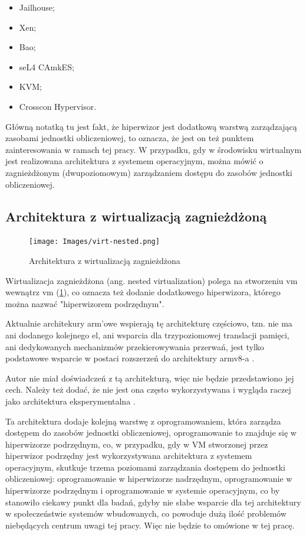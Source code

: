 \documentclass[../../main]{subfiles}
\begin{document}
\begin{itemize}
    \item Jailhouse;
    \item Xen;
    \item Bao;
    \item seL4 CAmkES;
    \item KVM;
    \item Crosscon Hypervisor.
\end{itemize}

Główną notatką tu jest fakt, że hiperwizor jest dodatkową warstwą zarządzającą zasobami jednostki
obliczeniowej, to oznacza, że jest on też punktem zainteresowania w ramach tej pracy. W przypadku, gdy
w środowisku wirtualnym jest realizowana architektura z systemem operacyjnym, można mówić o
zagnieżdżonym (dwupoziomowym) zarządzaniem dostępu do zasobów jednostki obliczeniowej.

\subsection{Architektura z wirtualizacją zagnieżdżoną}
\begin{figure}[h]
    \centering
    \texttt{[image: Images/virt-nested.png]}
    \caption{Architektura z wirtualizacją zagnieżdżona}
    \label{fig:virt-nestet}
\end{figure}

Wirtualizacja zagnieżdżona (ang. nested virtualization) polega na stworzeniu \acrshort{vm} wewnątrz
\acrshort{vm} (\cref{fig:virt-nestet}), co oznacza też dodanie dodatkowego hiperwizora, którego można
nazwać "hiperwizorem podrzędnym".

Aktualnie architekury \acrshort{arm}'owe wspierają tę architekturę częściowo, tzn. nie ma ani dodanego
kolejnego \acrshort{el}, ani wsparcia dla trzypoziomowej translacji pamięci, ani dedykowanych
mechanizmów przekierowywania przerwań, jest tylko podstawowe wsparcie w postaci rozszerzeń do
architektury \acrshort{arm}v8-\acrshort{a} \cite{nestvirtarm}.

Autor nie miał doświadczeń z tą architekturą, więc nie będzie przedstawiono jej cech. Należy też
dodać, że nie jest ona często wykorzystywana i wygląda raczej jako architektura eksperymentalna
\cite{nestvirtarm}.

Ta architektura dodaje kolejną warstwę z oprogramowaniem, która zarządza dostępem do zasobów jednostki
obliczeniowej, oprogramowanie to znajduje się w hiperwizorze podrzędnym, co, w przypadku, gdy w VM
stworzonej przez hiperwizor podrzędny jest wykorzystywana architektura z systemem operacyjnym,
skutkuje trzema poziomami zarządzania dostępem do jednostki obliczeniowej: oprogramowanie w
hiperwizorze nadrzędnym, oprogramowanie w hiperwizorze podrzędnym i oprogramowanie w systemie
operacyjnym, co by stanowiło ciekawy punkt dla badań, gdyby nie słabe wsparcie dla tej architektury w
społeczeństwie systemów wbudowanych, co powoduje dużą ilość problemów niebędących centrum uwagi tej
pracy. Więc nie będzie to omówione w tej pracę.
\end{document}
